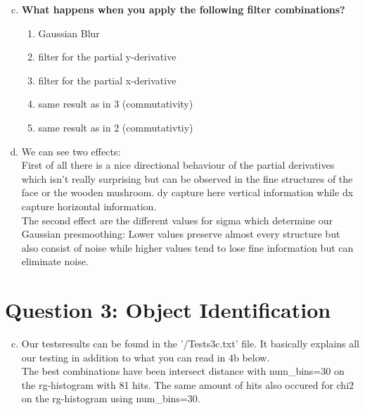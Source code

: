 \documentclass[12pt]{article}
\begin{document}
\begin{enumerate}[a)]
    \setcounter{enumi}{2}
    \item 
        \textbf{What happens when you apply the following filter combinations?}\\
        \begin{enumerate}[1.]
            \item 
                Gaussian Blur
            \item
                filter for the partial y-derivative
            \item
                filter for the partial x-derivative
            \item
                same result as in 3 (commutativity)
            \item 
                same result as in 2 (commutativtiy)
        \end{enumerate}

    \item
        We can see two effects:\\
        First of all there is a nice directional behaviour of the partial derivatives which isn't really surprising but can be observed in the fine structures of the face or the wooden mushroom. dy capture here vertical information while dx capture horizontal information.\\
        The second effect are the different values for sigma which determine our Gaussian presmoothing: Lower values preserve almost every structure but also consist of noise while higher values tend to lose fine information but can eliminate noise.
\end{enumerate}


\section*{Question 3: Object Identification}

\begin{enumerate}[a)]
    \setcounter{enumi}{2}
    \item 
        Our testsresults can be found in the '/Tests3c.txt' file. It basically explains all our testing in addition to what you can read in 4b below.\\
        The best combinations have been intersect distance with num\_bins=30 on the rg-histogram with 81 hits. The same amount of hits also occured for chi2 on the rg-histogram using num\_bins=30.
\end{enumerate}
\end{document}
